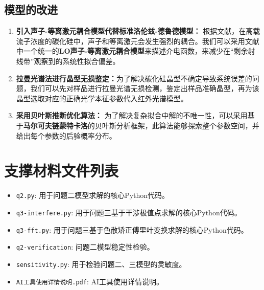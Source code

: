 \documentclass[a4paper]{ctexart}
\begin{document}
\subsection{模型的改进}
\begin{enumerate}
    \item \textbf{引入声子-等离激元耦合模型代替标准洛伦兹-德鲁德模型：}
    根据文献\cite{shokhovets2011infrared}，在高载流子浓度的碳化硅中，声子和等离激元会发生强烈的耦合。我们可以采用文献中一个统一的\textbf{LO声子-等离激元耦合模型}来描述介电函数，来减少在“剩余射线带”观察到的系统性拟合偏差。
    \item \textbf{拉曼光谱法进行晶型无损鉴定：}为了解决碳化硅晶型不确定导致系统误差的问题，我们可以先对样品进行拉曼光谱无损检测，鉴定出样品准确晶型，再为该晶型选取对应的正确光学本征参数代入红外光谱模型。
    \item \textbf{采用贝叶斯推断优化算法：}
    为了解决复杂拟合中解的不唯一性，可以采用基于\textbf{马尔可夫链蒙特卡洛}的贝叶斯分析框架\cite{arregui2019bayesian}，此算法能够探索整个参数空间，并给出每个参数的后验概率分布。
\end{enumerate}



        





\appendix
\newpage
\section{支撑材料文件列表}
\begin{itemize}
    \item \texttt{q2.py}: 用于问题二模型求解的核心Python代码。
    \item \texttt{q3-interfere.py}: 用于问题三基于干涉极值点求解的核心Python代码。
    \item \texttt{q3-fft.py}: 用于问题三基于色散矫正傅里叶变换求解的核心Python代码。
    \item \texttt{q2-verification}: 问题二模型稳定性检验。
    \item \texttt{sensitivity.py}: 用于检验问题二、三模型的灵敏度。
    \item \texttt{AI工具使用详情说明.pdf}: AI工具使用详情说明。
\end{itemize}
\end{document}
